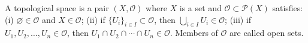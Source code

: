A topological space is a pair $(X, \mathcal{O})$ where $X$ is a set and $\mathcal{O} \subset \mathcal{P}(X)$ satisfies:
(i) $\varnothing \in \mathcal{O}$ and $X \in \mathcal{O}$;
(ii) if $\{U_i\}_{i \in I} \subset \mathcal{O}$, then $\bigcup_{i \in I} U_i \in \mathcal{O}$;
(iii) if $U_1, U_2, \ldots, U_n \in \mathcal{O}$, then $U_1 \cap U_2 \cap \cdots \cap U_n \in \mathcal{O}$.
Members of $\mathcal{O}$ are called open sets.